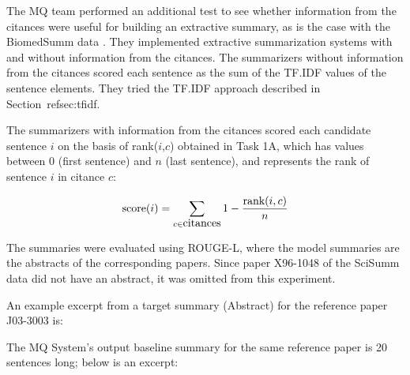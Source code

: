 \documentclass[11pt]{article}
\begin{document}
The MQ team performed an additional test to see whether information from the citances were useful for building an extractive summary, as is the case with the BiomedSumm data \cite{Molla:ALTA2014}. They implemented extractive summarization systems with and without information from the citances.  The summarizers without information from the citances scored each sentence as the sum of the TF.IDF values of the sentence elements. They tried the TF.IDF approach described in Section~ref{sec:tfidf}.

The summarizers with information from the citances scored each candidate sentence $i$ on the basis of rank($i$,$c$) obtained in Task 1A, which has values between 0 (first sentence) and $n$ (last sentence), and represents the rank of sentence $i$ in citance $c$:

$$
\hbox{score}(i) = \sum_{c\in\hbox{citances}}1-\frac{\hbox{rank}(i,c)}{n}
$$

The summaries were evaluated using ROUGE-L, where the model summaries are the abstracts of the corresponding papers. Since paper X96-1048 of the SciSumm data did not have an abstract, it was omitted from this experiment.

An example excerpt from a target summary (Abstract) for the reference 
paper J03-3003 is:

\noindent{}

The MQ System's output baseline summary for the same reference paper is 20 sentences long; below is an excerpt:
\end{document}

